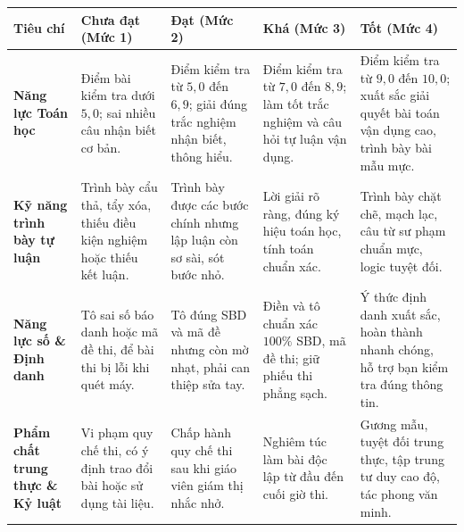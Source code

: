 \documentclass[12pt, a4paper]{article}
\begin{document}
\begin{center}
\small
\begin{tabularx}{\textwidth}{|p{2.8cm}|X|X|X|X|}
\hline
\textbf{Tiêu chí} & \textbf{Chưa đạt (Mức 1)} & \textbf{Đạt (Mức 2)} & \textbf{Khá (Mức 3)} & \textbf{Tốt (Mức 4)} \\ \hline
\textbf{Năng lực Toán học} & Điểm bài kiểm tra dưới $5{,}0$; sai nhiều câu nhận biết cơ bản. & Điểm kiểm tra từ $5{,}0$ đến $6{,}9$; giải đúng trắc nghiệm nhận biết, thông hiểu. & Điểm kiểm tra từ $7{,}0$ đến $8{,}9$; làm tốt trắc nghiệm và câu hỏi tự luận vận dụng. & Điểm kiểm tra từ $9{,}0$ đến $10{,}0$; xuất sắc giải quyết bài toán vận dụng cao, trình bày bài mẫu mực. \\ \hline
\textbf{Kỹ năng trình bày tự luận} & Trình bày cẩu thả, tẩy xóa, thiếu điều kiện nghiệm hoặc thiếu kết luận. & Trình bày được các bước chính nhưng lập luận còn sơ sài, sót bước nhỏ. & Lời giải rõ ràng, đúng ký hiệu toán học, tính toán chuẩn xác. & Trình bày chặt chẽ, mạch lạc, câu từ sư phạm chuẩn mực, logic tuyệt đối. \\ \hline
\textbf{Năng lực số \& Định danh} & Tô sai số báo danh hoặc mã đề thi, để bài thi bị lỗi khi quét máy. & Tô đúng SBD và mã đề nhưng còn mờ nhạt, phải can thiệp sửa tay. & Điền và tô chuẩn xác $100\%$ SBD, mã đề thi; giữ phiếu thi phẳng sạch. & Ý thức định danh xuất sắc, hoàn thành nhanh chóng, hỗ trợ bạn kiểm tra đúng thông tin. \\ \hline
\textbf{Phẩm chất trung thực \& Kỷ luật} & Vi phạm quy chế thi, có ý định trao đổi bài hoặc sử dụng tài liệu. & Chấp hành quy chế thi sau khi giáo viên giám thị nhắc nhở. & Nghiêm túc làm bài độc lập từ đầu đến cuối giờ thi. & Gương mẫu, tuyệt đối trung thực, tập trung tư duy cao độ, tác phong văn minh. \\ \hline
\end{tabularx}
\end{center}
\end{document}
